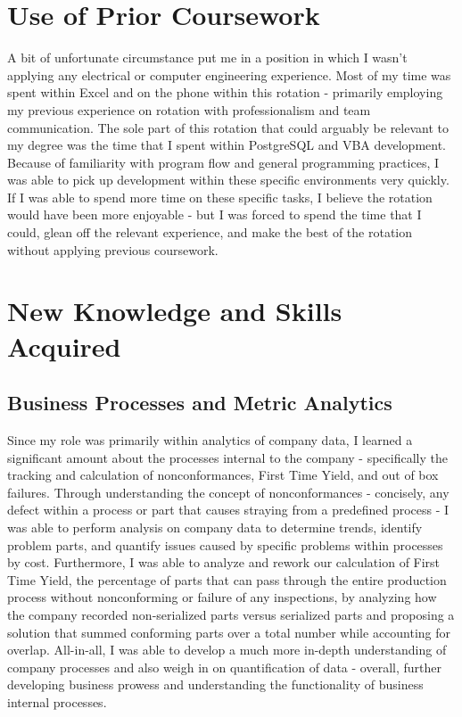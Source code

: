 \documentclass{article}
\begin{document}
\section{Use of Prior Coursework}
A bit of unfortunate circumstance put me in a position in which I wasn't applying any electrical or computer engineering experience. Most of my time was spent within Excel and on the phone within this rotation - primarily employing my previous experience on rotation with professionalism and team communication.
The sole part of this rotation that could arguably be relevant to my degree was the time that I spent within PostgreSQL and VBA development. Because of familiarity with program flow and general programming practices, I was able to pick up development within these specific environments very quickly. If I was able to spend more time on these specific tasks, I believe the rotation would have been more enjoyable - but I was forced to spend the time that I could, glean off the relevant experience, and make the best of the rotation without applying previous coursework.

\newpage
\section{New Knowledge and Skills Acquired}
\subsection{Business Processes and Metric Analytics}
Since my role was primarily within analytics of company data, I learned a significant amount about the processes internal to the company - specifically the tracking and calculation of nonconformances, First Time Yield, and out of box failures. Through understanding the concept of nonconformances - concisely, any defect within a process or part that causes straying from a predefined process - I was able to perform analysis on company data to determine trends, identify problem parts, and quantify issues caused by specific problems within processes by cost. Furthermore, I was able to analyze and rework our calculation of First Time Yield, the percentage of parts that can pass through the entire production process without nonconforming or failure of any inspections, by analyzing how the company recorded non-serialized parts versus serialized parts and proposing a solution that summed conforming parts over a total number while accounting for overlap. All-in-all, I was able to develop a much more in-depth understanding of company processes and also weigh in on quantification of data - overall, further developing business prowess and understanding the functionality of business internal processes.
\end{document}
